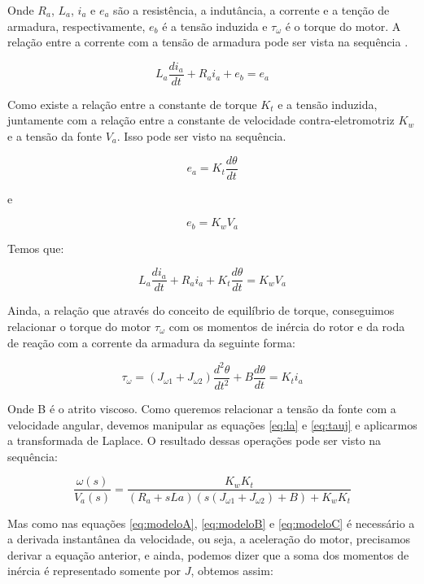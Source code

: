 Onde $R_a$, $L_a$, $i_a$ e $e_a$ são a resistência, a indutância, a corrente e a tenção de armadura, respectivamente, $e_b$ é a tensão induzida e $\tau_{\omega}$ é o torque do motor. A relação entre a corrente com a tensão de armadura pode ser vista na sequência \cite{Ogata}.

\begin{equation}
L_a \frac{di_a}{dt}+R_a i_a + e_b = e_a
\end{equation}

Como existe a relação entre a constante de torque $K_t$ e a tensão induzida, juntamente com a relação entre a constante de velocidade contra-eletromotriz $K_w$ e a tensão da fonte $V_a$. Isso pode ser visto na sequência.

\begin{equation}
  e_a = K_t\frac{d\theta}{dt}
\end{equation}

e

\begin{equation}
  e_b = K_wV_a
\end{equation}

Temos que:

\begin{equation}\label{eq:la}
L_a \frac{di_a}{dt}+R_a i_a + K_t\frac{d\theta}{dt} = K_wV_a
\end{equation}

Ainda, a relação que através do conceito de equilíbrio de torque, conseguimos relacionar o torque do motor $\tau_{\omega}$ com os momentos de inércia do rotor e da roda de reação com a corrente da armadura da seguinte forma:

\begin{equation}\label{eq:tauj}
\tau_{\omega} = (J_{\omega 1} + J_{\omega 2})\frac{d^{2}\theta}{dt^{2}}+B\frac{d\theta}{dt} = K_t i_a
\end{equation}

Onde B é o atrito viscoso. Como queremos relacionar a tensão da fonte com a velocidade angular, devemos manipular as equações \ref{eq:la} e \ref{eq:tauj} e aplicarmos a transformada de Laplace. O resultado dessas operações pode ser visto na sequência: 

\begin{equation}
  \frac{\omega(s)}{V_a(s)} = \frac{K_wK_t}{(R_a+ sLa)(s(J_{\omega 1} + J_{\omega 2})+B)+K_wK_t}  
\end{equation}

Mas como nas equações \ref{eq:modeloA}, \ref{eq:modeloB} e \ref{eq:modeloC} é necessário a a derivada instantânea da velocidade, ou seja, a aceleração do motor, precisamos derivar a equação anterior, e ainda, podemos dizer que a soma dos momentos de inércia é representado somente por $J$, obtemos assim:


